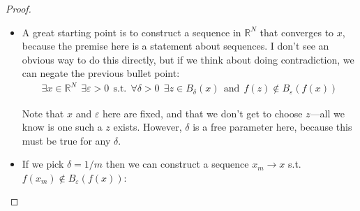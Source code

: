 \documentclass{article}
\theoremstyle{definition}
\begin{document}
\begin{proof}
\begin{enumerate}
\begin{itemize}
        \item A great starting point is to construct a sequence in $\mathbb{R}^N$ that converges to $x$, because the premise here is a statement about sequences. I don't see an obvious way to do this directly, but if we think about doing contradiction, we can negate the previous bullet point:
          \begin{align*}
            \exists x \in \mathbb{R}^N
            ~~
            \exists \varepsilon > 0
            ~~\text{s.t.}~~
            \forall \delta > 0
            ~~
            \exists z \in B_{\delta}(x)
            ~~\text{and}~~
            f(z) \notin B_{\varepsilon}(f(x))
          \end{align*}

          Note that $x$ and $\varepsilon$ here are fixed, and that we don't get to choose $z$---all we know is one such a $z$ exists. However, $\delta$ is a free parameter here, because this must be true for any $\delta$.

        \item If we pick $\delta = 1/m$ then we can construct a sequence $x_m \to x$ s.t. $f(x_m) \notin B_{\varepsilon}(f(x))$:
        \begin{figure}[H]
          \centering
\end{figure}
\end{itemize}
\end{enumerate}
\end{proof}
\end{document}
